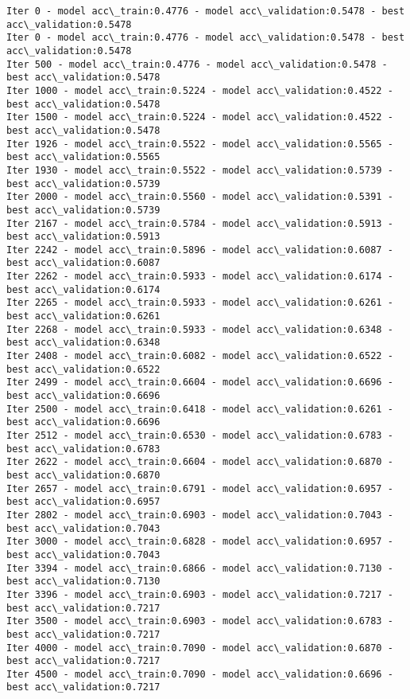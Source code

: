 \documentclass[11pt]{article}
\begin{document}
    \begin{Verbatim}[commandchars=\\\{\}]
Iter 0 - model acc\_train:0.4776 - model acc\_validation:0.5478 - best acc\_validation:0.5478
Iter 0 - model acc\_train:0.4776 - model acc\_validation:0.5478 - best acc\_validation:0.5478
Iter 500 - model acc\_train:0.4776 - model acc\_validation:0.5478 - best acc\_validation:0.5478
Iter 1000 - model acc\_train:0.5224 - model acc\_validation:0.4522 - best acc\_validation:0.5478
Iter 1500 - model acc\_train:0.5224 - model acc\_validation:0.4522 - best acc\_validation:0.5478
Iter 1926 - model acc\_train:0.5522 - model acc\_validation:0.5565 - best acc\_validation:0.5565
Iter 1930 - model acc\_train:0.5522 - model acc\_validation:0.5739 - best acc\_validation:0.5739
Iter 2000 - model acc\_train:0.5560 - model acc\_validation:0.5391 - best acc\_validation:0.5739
Iter 2167 - model acc\_train:0.5784 - model acc\_validation:0.5913 - best acc\_validation:0.5913
Iter 2242 - model acc\_train:0.5896 - model acc\_validation:0.6087 - best acc\_validation:0.6087
Iter 2262 - model acc\_train:0.5933 - model acc\_validation:0.6174 - best acc\_validation:0.6174
Iter 2265 - model acc\_train:0.5933 - model acc\_validation:0.6261 - best acc\_validation:0.6261
Iter 2268 - model acc\_train:0.5933 - model acc\_validation:0.6348 - best acc\_validation:0.6348
Iter 2408 - model acc\_train:0.6082 - model acc\_validation:0.6522 - best acc\_validation:0.6522
Iter 2499 - model acc\_train:0.6604 - model acc\_validation:0.6696 - best acc\_validation:0.6696
Iter 2500 - model acc\_train:0.6418 - model acc\_validation:0.6261 - best acc\_validation:0.6696
Iter 2512 - model acc\_train:0.6530 - model acc\_validation:0.6783 - best acc\_validation:0.6783
Iter 2622 - model acc\_train:0.6604 - model acc\_validation:0.6870 - best acc\_validation:0.6870
Iter 2657 - model acc\_train:0.6791 - model acc\_validation:0.6957 - best acc\_validation:0.6957
Iter 2802 - model acc\_train:0.6903 - model acc\_validation:0.7043 - best acc\_validation:0.7043
Iter 3000 - model acc\_train:0.6828 - model acc\_validation:0.6957 - best acc\_validation:0.7043
Iter 3394 - model acc\_train:0.6866 - model acc\_validation:0.7130 - best acc\_validation:0.7130
Iter 3396 - model acc\_train:0.6903 - model acc\_validation:0.7217 - best acc\_validation:0.7217
Iter 3500 - model acc\_train:0.6903 - model acc\_validation:0.6783 - best acc\_validation:0.7217
Iter 4000 - model acc\_train:0.7090 - model acc\_validation:0.6870 - best acc\_validation:0.7217
Iter 4500 - model acc\_train:0.7090 - model acc\_validation:0.6696 - best acc\_validation:0.7217

    \end{Verbatim}
\end{document}
